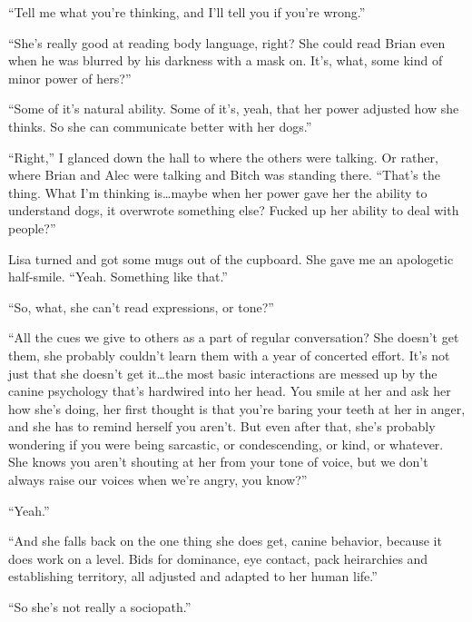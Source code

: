 ``Tell me what you're thinking, and I'll tell you if you're wrong.''



``She's really good at reading body language, right?  She could read Brian even when he was blurred by his darkness with a mask on.  It's, what, some kind of minor power of hers?''



``Some of it's natural ability.  Some of it's, yeah, that her power adjusted how she thinks.  So she can communicate better with her dogs.''



``Right,'' I glanced down the hall to where the others were talking.  Or rather, where Brian and Alec were talking and Bitch was standing there.  ``That's the thing.  What I'm thinking is\ldots maybe when her power gave her the ability to understand dogs, it overwrote something else?  Fucked up her ability to deal with people?''



Lisa turned and got some mugs out of the cupboard.  She gave me an apologetic half-smile. ``Yeah.  Something like that.''



``So, what, she can't read expressions, or tone?''



``All the cues we give to others as a part of regular conversation?  She doesn't get them, she probably couldn't learn them with a year of concerted effort.  It's not just that she doesn't get it\ldots the most basic interactions are messed up by the canine psychology that's hardwired into her head.  You smile at her and ask her how she's doing, her first thought is that you're baring your teeth at her in anger, and she has to remind herself you aren't.  But even after that, she's probably wondering if you were being sarcastic, or condescending, or kind, or whatever.  She knows you aren't shouting at her from your tone of voice, but we don't always raise our voices when we're angry, you know?''



``Yeah.''



``And she falls back on the one thing she does get, canine behavior, because it does work on a level.  Bids for dominance, eye contact, pack heirarchies and establishing territory, all adjusted and adapted to her human life.''



``So she's not really a sociopath.''



